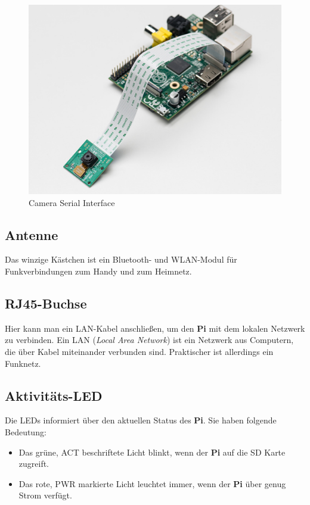 \documentclass[12pt,a4paper]{article}
\begin{document}
\begin{figure}[H]
\centering
\includegraphics[scale=.8]{csi}
\caption{Camera Serial Interface}
\label{fig:csi}
\end{figure}

\subsection{Antenne}

Das winzige Kästchen ist ein Bluetooth- und WLAN-Modul für Funkverbindungen zum Handy und zum Heimnetz.

\subsection{RJ45-Buchse}

Hier kann man ein LAN-Kabel anschließen, um den \textbf{Pi} mit dem lokalen Netzwerk zu verbinden. Ein LAN (\textit{Local Area Network}) ist ein Netzwerk aus Computern, die über Kabel miteinander verbunden sind. Praktischer ist allerdings ein Funknetz.

\subsection{Aktivitäts-LED}

Die LEDs informiert über den aktuellen Status des \textbf{Pi}. Sie haben folgende Bedeutung:
\begin{itemize}
\item Das grüne, ACT beschriftete Licht blinkt, wenn der \textbf{Pi} auf die SD Karte zugreift.
\item Das rote, PWR markierte Licht leuchtet immer, wenn der \textbf{Pi} über genug Strom verfügt.
\end{itemize}
\end{document}
